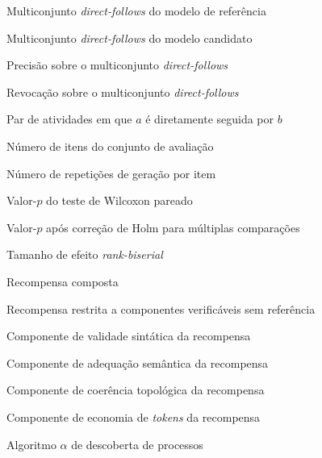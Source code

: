 %

\begin{simbolos} \itemsep -1pt
	\item[$ \mathcal{R} $] Multiconjunto \textit{direct-follows} do modelo de referência
	\item[$ \mathcal{C} $] Multiconjunto \textit{direct-follows} do modelo candidato
	\item[$ P $] Precisão sobre o multiconjunto \textit{direct-follows}
	\item[$ R $] Revocação sobre o multiconjunto \textit{direct-follows}
	\item[$ (a,b) $] Par de atividades em que $a$ é diretamente seguida por $b$

	\item[$ n $] Número de itens do conjunto de avaliação
	\item[$ k $] Número de repetições de geração por item

	\item[$ p $] Valor-$p$ do teste de Wilcoxon pareado
	\item[$ p_{Holm} $] Valor-$p$ após correção de Holm para múltiplas comparações
	\item[$ r_{rb} $] Tamanho de efeito \textit{rank-biserial}

	\item[$ r $] Recompensa composta
	\item[$ r' $] Recompensa restrita a componentes verificáveis sem referência
	\item[$ r_{\text{sint}} $] Componente de validade sintática da recompensa
	\item[$ r_{\text{sem}} $] Componente de adequação semântica da recompensa
	\item[$ r_{\text{topo}} $] Componente de coerência topológica da recompensa
	\item[$ r_{\text{comp}} $] Componente de economia de \textit{tokens} da recompensa

	\item[$ \alpha $] Algoritmo $\alpha$ de descoberta de processos
\end{simbolos}
